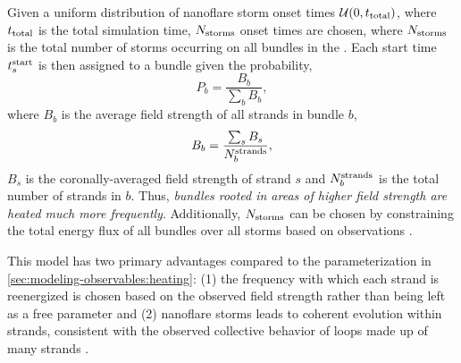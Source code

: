 Given a uniform distribution of nanoflare storm onset times $\mathcal{U}(0,t_\textup{total})$, where $t_\textup{total}$ is the total simulation time, $N_\textup{storms}$ onset times are chosen, where $N_\textup{storms}$ is the total number of storms occurring on all bundles in the \AR{}. Each start time $t_s^\textup{start}$ is then assigned to a bundle given the probability,
\begin{equation*}
    P_b = \frac{B_b}{\sum_b B_b},
\end{equation*}
where $B_b$ is the average field strength of all strands in bundle $b$,
\begin{equation*}
    B_b = \frac{\sum_s B_s}{N^\textup{strands}_b},
\end{equation*}
$B_s$ is the coronally-averaged field strength of strand $s$ and $N^\textup{strands}_b$ is the total number of strands in $b$. Thus, \textit{bundles rooted in areas of higher field strength are heated much more frequently}. Additionally, $N_\textup{storms}$ can be chosen by constraining the total energy flux of all bundles over all storms based on observations \citep[e.g. \SI{e7}{\erg\per\square\cm\per\second} from][as in \autoref{sec:modeling-observables:heating}]{withbroe_mass_1977}.

This model has two primary advantages compared to the parameterization in \autoref{sec:modeling-observables:heating}: (1) the frequency with which each strand is reenergized is chosen based on the observed field strength rather than being left as a free parameter and (2) nanoflare storms leads to coherent evolution within strands, consistent with the observed collective behavior of loops made up of many strands \citep{klimchuk_key_2015}.

